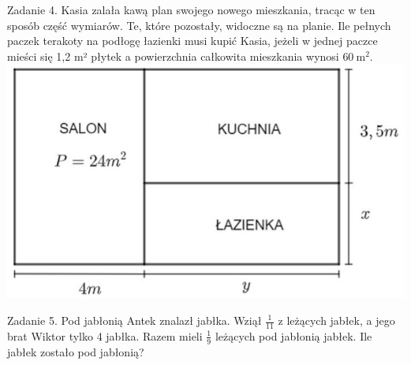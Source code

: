 \documentclass[10pt]{article}
\begin{document}
Zadanie 4. Kasia zalała kawą plan swojego nowego mieszkania, tracąc w ten sposób część wymiarów. Te, które pozostały, widoczne są na planie. Ile pełnych paczek terakoty na podłogę łazienki musi kupić Kasia, jeżeli w jednej paczce mieści się 1,2 m² płytek a powierzchnia całkowita mieszkania wynosi \(60 \mathrm{~m}^{2}\).\\
\includegraphics[max width=\textwidth, center]{2024_11_21_c6672992d8aeb6aa1085g-1}

Zadanie 5. Pod jabłonią Antek znalazł jabłka. Wziął \(\frac{1}{11}\) z leżących jabłek, a jego brat Wiktor tylko 4 jabłka. Razem mieli \(\frac{1}{9}\) leżących pod jabłonią jabłek. Ile jabłek zostało pod jabłonią?
\end{document}
